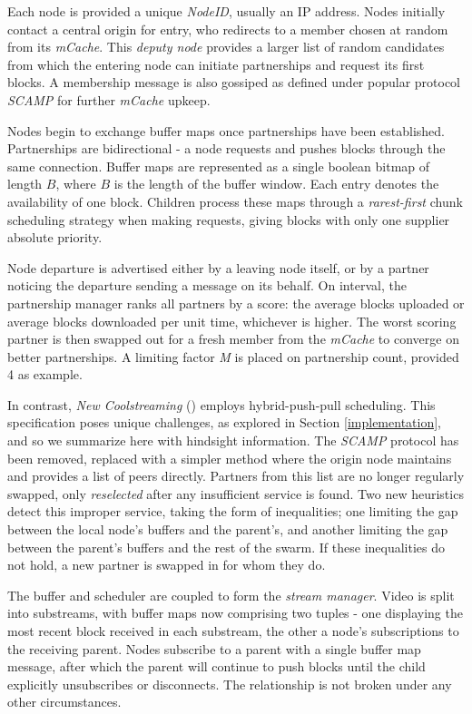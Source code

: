 \documentclass[12pt,a4paper]{article}
\begin{document}
Each node is provided a unique \textit{NodeID}, usually an IP address. Nodes initially contact a central origin for entry, who redirects to a member chosen at random from its \textit{mCache}. This \textit{deputy node} provides a larger list of random candidates from which the entering node can initiate partnerships and request its first blocks. A membership message is also gossiped as defined under popular protocol \textit{SCAMP} for further \textit{mCache} upkeep.

Nodes begin to exchange buffer maps once partnerships have been established. Partnerships are bidirectional - a node requests and pushes blocks through the same connection. Buffer maps are represented as a single boolean bitmap of length \(B\), where \(B\) is the length of the buffer window. Each entry denotes the availability of one block. Children process these maps through a \textit{rarest-first} chunk scheduling strategy when making requests, giving blocks with only one supplier absolute priority.

Node departure is advertised either by a leaving node itself, or by a partner noticing the departure sending a message on its behalf. On interval, the partnership manager ranks all partners by a score: the average blocks uploaded or average blocks downloaded per unit time, whichever is higher. The worst scoring partner is then swapped out for a fresh member from the \textit{mCache} to converge on better partnerships. A limiting factor \textit{M} is placed on partnership count, provided 4 as example.

In contrast, \textit{New Coolstreaming} (\cite{Li2008}) employs hybrid-push-pull scheduling. This specification poses unique challenges, as explored in Section \ref{implementation}, and so we summarize here with hindsight information. The \textit{SCAMP} protocol has been removed, replaced with a simpler method where the origin node maintains and provides a list of peers directly. Partners from this list are no longer regularly swapped, only \textit{reselected} after any insufficient service is found. Two new heuristics detect this improper service, taking the form of inequalities; one limiting the gap between the local node's buffers and the parent's, and another limiting the gap between the parent's buffers and the rest of the swarm. If these inequalities do not hold, a new partner is swapped in for whom they do.

The buffer and scheduler are coupled to form the \textit{stream manager}. Video is split into substreams, with buffer maps now comprising two tuples - one displaying the most recent block received in each substream, the other a node's subscriptions to the receiving parent. Nodes subscribe to a parent with a single buffer map message, after which the parent will continue to push blocks until the child explicitly unsubscribes or disconnects. The relationship is not broken under any other circumstances.
\end{document}
